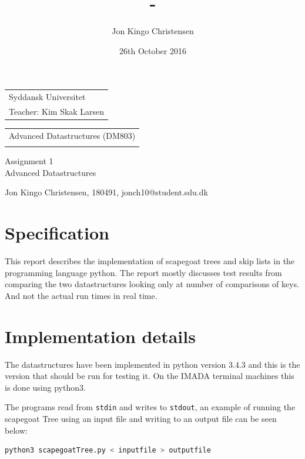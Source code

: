 \documentclass[12pt, a4paper]{article}
\date{26th October 2016}
\author{Jon Kingo Christensen}
\title{\papertitle{} - \papersubtitle{}}
\makeatletter
\def\identification{Jon Kingo Christensen, 180491, jonch10@student.sdu.dk}
\def\courseCode{DM803}
\def\courseTitle{Advanced Datastructures}
\def\lectorLabel{Teacher:}
\def\lector{Kim Skak Larsen}
\def\universityName{Syddansk Universitet}
\def\papertitle{Assignment 1}
\def\papersubtitle{\courseTitle}
\makeatother
\begin{document}

\begin{tabular}{@{}l}
\universityName{} \\
\lectorLabel{} \lector{}
\end{tabular}
\hfill
\begin{tabular}{r@{}}
\courseTitle{} (\courseCode{}) \\
\thedate{}
\end{tabular}

\bigskip

\begin{center}
    \Huge{\papertitle{}} \\
    \Large{\papersubtitle{}}
\end{center}
\normalsize{}

\begin{center}
    \identification{}
\end{center}






\section*{Specification}
This report describes the implementation of scapegoat trees and skip lists in the programming language python. The report mostly 
discusses test results from comparing the two datastructures looking only at number of comparisons of keys. 
And not the actual run times in real time.


\section*{Implementation details}
The datastructures have been implemented in python version 3.4.3 and this is the version that should be run for testing it.
On the IMADA terminal machines this is done using python3.

\medskip

The programs read from \texttt{stdin} and writes to \texttt{stdout}, an example of running the scapegoat Tree using an input file and writing
to an output file can be seen below:
\begin{lstlisting}[language=bash]
  python3 scapegoatTree.py < inputfile > outputfile
\end{lstlisting}
\end{document}

